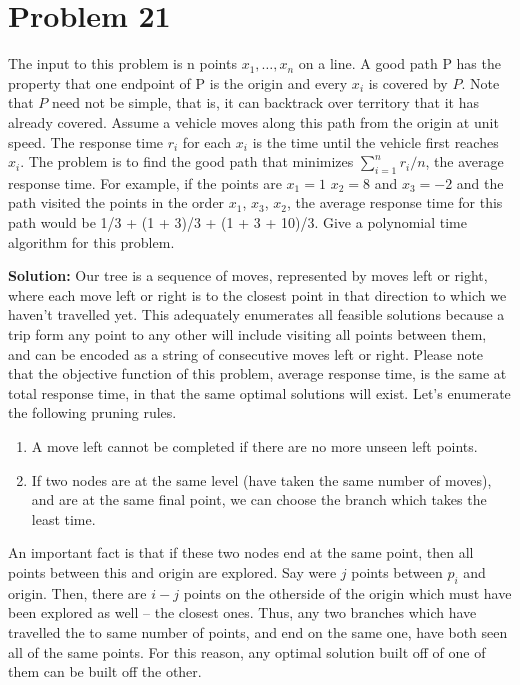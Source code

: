 \documentclass{article}
\providecommand{\prob}[1]{\section*{Problem #1}}
\providecommand{\soln}{\textbf{Solution: }}
\begin{document}
\pagebreak
\prob{21}
The input to this problem is n points $x_1, \dots , x_n$ on a line. A good path P has the property that one endpoint of P is the origin and every $x_i$ is covered by $P$. Note that $P$ need not be simple, that is, it can backtrack over territory that it has already covered. Assume a vehicle moves along this path from the origin at unit speed. The response time $r_i$ for each $x_i$ is the time until the vehicle first reaches $x_i$. The problem is to find the good path that minimizes $\sum_{i=1}^n r_i/n$, the average response time.
For example, if the points are $x_1 = 1$ $x_2 = 8$ and $x_3 = −2$ and the path visited the points in the order $x_1$, $x_3$, $x_2$, the average response time for this path would be 1/3 + (1 + 3)/3 + (1 + 3 + 10)/3. Give a polynomial time algorithm for this problem.

\soln Our tree is a sequence of moves, represented by moves left or right, where each move left or right is to the closest point in that direction to which we haven't travelled yet.
This adequately enumerates all feasible solutions because a trip form any point to any other will include visiting all points between them, and can be encoded as a string of consecutive moves left or right.
Please note that the objective function of this problem, average response time, is the same at total response time, in that the same optimal solutions will exist.
Let's enumerate the following pruning rules.

\begin{enumerate}
    \item A move left cannot be completed if there are no more unseen left points.
    \item If two nodes are at the same level (have taken the same number of moves), and are at the same final point, we can choose the branch which takes the least time.
\end{enumerate}

An important fact is that if these two nodes end at the same point, then all points between this and origin are explored.
Say were $j$ points between $p_i$ and origin. Then, there are $i - j$ points on the otherside of the origin which must have been explored as well -- the closest ones.
Thus, any two branches which have travelled the to same number of points, and end on the same one, have both seen all of the same points.
For this reason, any optimal solution built off of one of them can be built off the other.
\end{document}
